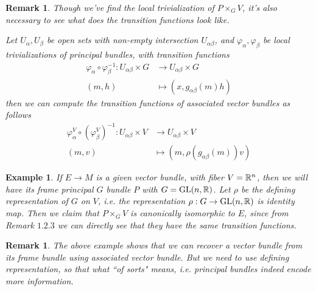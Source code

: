 \documentclass[11pt]{amsart}
\numberwithin{equation}{section}
\theoremstyle{plain}
\theoremstyle{plain}
\newtheorem{remksub}[thmsub]{Remark}
\newtheorem{exsub}[thmsub]{Example}
\numberwithin{equation}{section}
\begin{document}
\begin{remksub}\normalfont
Though we've find the local trivialization of $P\times_GV$, it's also necessary to see what does the transition functions look like.

Let $U_{\alpha},U_{\beta}$ be open sets with non-empty intersection $U_{\alpha\beta}$, and $\varphi_{\alpha},\varphi_{\beta}$ be local trivializations of principal bundles, with transition functions 
$$
\begin{aligned}
\varphi_{\alpha}\circ\varphi^{-1}_{\beta}:U_{\alpha\beta}\times G&\to U_{\alpha\beta}\times G\\
(m,h)&\mapsto (x,g_{\alpha\beta}(m)h)
\end{aligned}
$$
then we can compute the transition functions of associated vector bundles as follows
$$
\begin{aligned}
\varphi^V_{\alpha}\circ (\varphi^V_{\beta})^{-1}: U_{\alpha\beta}\times V&\to U_{\alpha\beta}\times V\\
(m,v)&\mapsto (m, \rho(g_{\alpha\beta}(m))v)
\end{aligned}
$$
\end{remksub}
\begin{exsub}\normalfont
If $E\to M$ is a given vector bundle, with fiber $V=\Bbb{R}^n$, then we will have its frame principal $G$ bundle $P$ with $G=\operatorname{GL}(n,\Bbb{R})$. Let $\rho$ be the defining representation of $G$ on $V$, i.e. the representation $\rho:G\to\operatorname{GL}(n,\Bbb{R})$ is identity map. Then we claim that $P\times_GV$ is canonically isomorphic to $E$, since from Remark $1.2.3$ we can directly see that they have the same transition functions.
\end{exsub}
\begin{remksub}\normalfont
The above example shows that we can recover a vector bundle from its frame bundle using associated vector bundle. But we need to use defining representation, so that what “of sorts" means, i.e. principal bundles indeed encode more information.
\end{remksub}
\end{document}
